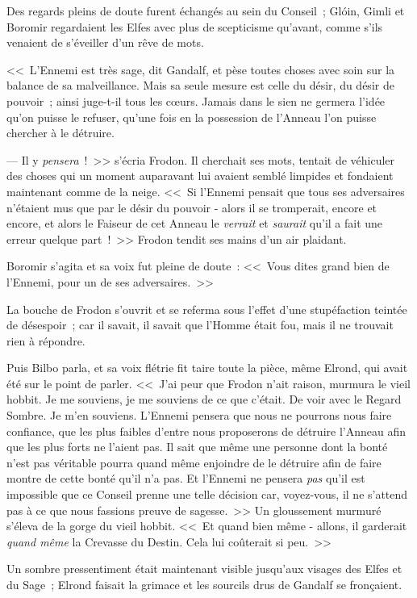 Des regards pleins de doute furent échangés au sein du Conseil~; Glóin, Gimli et Boromir regardaient les Elfes avec plus de scepticisme qu'avant, comme s'ils venaient de s'éveiller d'un rêve de mots.

<<~L'Ennemi est très sage, dit Gandalf, et pèse toutes choses avec soin sur la balance de sa malveillance. Mais sa seule mesure est celle du désir, du désir de pouvoir~; ainsi juge-t-il tous les cœurs. Jamais dans le sien ne germera l'idée qu'on puisse le refuser, qu'une fois en la possession de l'Anneau l'on puisse chercher à le détruire.

--- Il y \emph{pensera}~!~>> s'écria Frodon. Il cherchait ses mots, tentait de véhiculer des choses qui un moment auparavant lui avaient semblé limpides et fondaient maintenant comme de la neige. <<~Si l'Ennemi pensait que tous ses adversaires n'étaient mus que par le désir du pouvoir - alors il se tromperait, encore et encore, et alors le Faiseur de cet Anneau le \emph{verrait} et \emph{saurait} qu'il a fait une erreur quelque part~!~>> Frodon tendit ses mains d'un air plaidant.

Boromir s'agita et sa voix fut pleine de doute~: <<~Vous dites grand bien de l'Ennemi, pour un de ses adversaires.~>>

La bouche de Frodon s'ouvrit et se referma sous l'effet d'une stupéfaction teintée de désespoir~; car il savait, il savait que l'Homme était fou, mais il ne trouvait rien à répondre.

Puis Bilbo parla, et sa voix flétrie fit taire toute la pièce, même Elrond, qui avait été sur le point de parler. <<~J'ai peur que Frodon n'ait raison, murmura le vieil hobbit. Je me souviens, je me souviens de ce que c'était. De voir avec le Regard Sombre. Je m'en souviens. L'Ennemi pensera que nous ne pourrons nous faire confiance, que les plus faibles d'entre nous proposerons de détruire l'Anneau afin que les plus forts ne l'aient pas. Il sait que même une personne dont la bonté n'est pas véritable pourra quand même enjoindre de le détruire afin de faire montre de cette bonté qu'il n'a pas. Et l'Ennemi ne pensera \emph{pas} qu'il est impossible que ce Conseil prenne une telle décision car, voyez-vous, il ne s'attend pas à ce que nous fassions preuve de sagesse.~>> Un gloussement murmuré s'éleva de la gorge du vieil hobbit. <<~Et quand bien même - allons, il garderait \emph{quand même} la Crevasse du Destin. Cela lui coûterait si peu.~>>

Un sombre pressentiment était maintenant visible jusqu'aux visages des Elfes et du Sage~; Elrond faisait la grimace et les sourcils drus de Gandalf se fronçaient.

